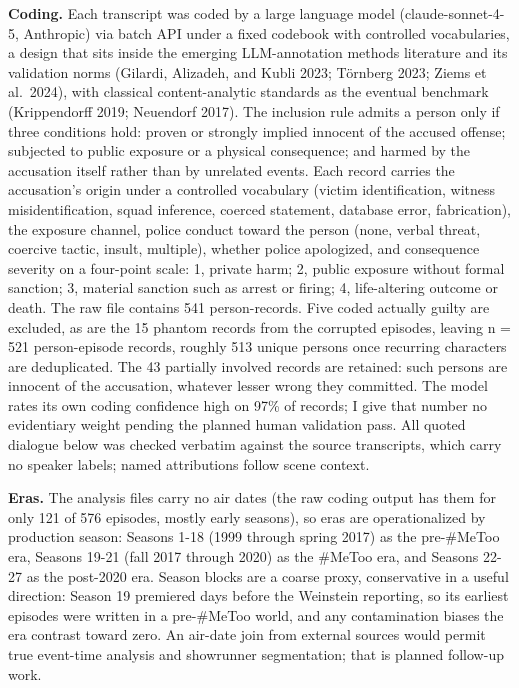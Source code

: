 \documentclass[
]{article}
\newcounter{none} %
\begin{document}
\textbf{Coding.} Each transcript was coded by a large language model
(claude-sonnet-4-5, Anthropic) via batch API under a fixed codebook with
controlled vocabularies, a design that sits inside the emerging
LLM-annotation methods literature and its validation norms (Gilardi,
Alizadeh, and Kubli 2023; Törnberg 2023; Ziems et al.~2024), with
classical content-analytic standards as the eventual benchmark
(Krippendorff 2019; Neuendorf 2017). The inclusion rule admits a person
only if three conditions hold: proven or strongly implied innocent of
the accused offense; subjected to public exposure or a physical
consequence; and harmed by the accusation itself rather than by
unrelated events. Each record carries the accusation's origin under a
controlled vocabulary (victim identification, witness misidentification,
squad inference, coerced statement, database error, fabrication), the
exposure channel, police conduct toward the person (none, verbal threat,
coercive tactic, insult, multiple), whether police apologized, and
consequence severity on a four-point scale: 1, private harm; 2, public
exposure without formal sanction; 3, material sanction such as arrest or
firing; 4, life-altering outcome or death. The raw file contains 541
person-records. Five coded actually guilty are excluded, as are the 15
phantom records from the corrupted episodes, leaving n = 521
person-episode records, roughly 513 unique persons once recurring
characters are deduplicated. The 43 partially involved records are
retained: such persons are innocent of the accusation, whatever lesser
wrong they committed. The model rates its own coding confidence high on
97\% of records; I give that number no evidentiary weight pending the
planned human validation pass. All quoted dialogue below was checked
verbatim against the source transcripts, which carry no speaker labels;
named attributions follow scene context.

\textbf{Eras.} The analysis files carry no air dates (the raw coding
output has them for only 121 of 576 episodes, mostly early seasons), so
eras are operationalized by production season: Seasons 1-18 (1999
through spring 2017) as the pre-\#MeToo era, Seasons 19-21 (fall 2017
through 2020) as the \#MeToo era, and Seasons 22-27 as the post-2020
era. Season blocks are a coarse proxy, conservative in a useful
direction: Season 19 premiered days before the Weinstein reporting, so
its earliest episodes were written in a pre-\#MeToo world, and any
contamination biases the era contrast toward zero. An air-date join from
external sources would permit true event-time analysis and showrunner
segmentation; that is planned follow-up work.
\end{document}
